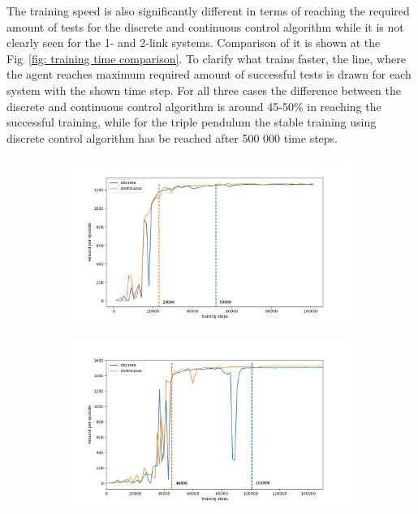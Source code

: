 The training speed is also significantly different in terms of reaching the required amount of tests for the discrete and continuous control algorithm while it is not clearly seen for the 1- and 2-link systems. Comparison of it is shown at the Fig~\ref{fig: training time comparison}. To clarify what trains faster, the line, where the agent reaches maximum required amount of successful tests is drawn for each system with the shown time step. For all three cases the difference between the discrete and continuous control algorithm is around 45-50$\%$ in reaching the successful training, while for the triple pendulum the stable training using discrete control algorithm has be reached after 500 000 time steps.  

\begin{figure}[h!]
	\centering
	\begin{subfigure}[t]{0.48\textwidth}
		\centering
		\includegraphics[width=\textwidth]{Figures/SP_discrete_vs_continuous_training_time.png}
		\label{fig: sp - training time}
		\caption{}
	\end{subfigure}
	\hfill
	\begin{subfigure}[t]{0.48\textwidth}
		\centering
		\includegraphics[width=\textwidth]{Figures/DP_discrete_vs_continuous_training_time.png}

\end{subfigure}
\end{figure}
